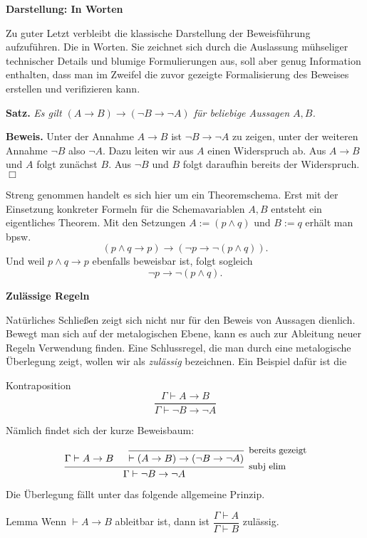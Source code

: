 \documentclass[8pt]{beamer}
\newcommand{\inote}[1]{{\small #1}}
\newcommand{\strong}[1]{\textsf{\textbf{#1}}}
\renewcommand{\qedsymbol}{\ensuremath{\Box}}
\newcommand{\centerheadline}[1]{%
  \begin{center}\strong{#1}\end{center}}
\newcommand{\parspace}{\vspace{0.8em}}
\newcommand{\cond}{\rightarrow}
\begin{document}
\begin{frame}[t]
\vspace{0.5em}
\strong{Darstellung: In Worten}

\parspace
Zu guter Letzt verbleibt die klassische Darstellung der Beweisführung
aufzuführen. Die in Worten. Sie zeichnet sich durch die Auslassung mühseliger
technischer Details und blumige Formulierungen aus, soll aber genug Information
enthalten, dass man im Zweifel die zuvor gezeigte Formalisierung des Beweises
erstellen und verifizieren kann.

\parspace
\strong{Satz.} \emph{Es gilt $(A\cond B)\cond (\lnot B\cond\lnot A)$ für
beliebige Aussagen $A,B$.}

\parspace
\strong{Beweis.}
Unter der Annahme $A\cond B$ ist $\lnot B\cond\lnot A$ zu zeigen,
unter der weiteren Annahme $\lnot B$ also $\lnot A$. Dazu leiten wir
aus $A$ einen Widerspruch ab. Aus $A\cond B$ und $A$ folgt zunächst $B$.
Aus $\lnot B$ und $B$ folgt daraufhin bereits der Widerspruch.\,\qedsymbol\pause

\parspace
Streng genommen handelt es sich hier um ein Theoremschema. Erst mit
der Einsetzung konkreter Formeln für die Schemavariablen $A,B$ entsteht
ein eigentliches Theorem. Mit den Setzungen $A:=(p\land q)$ und $B:=q$
erhält man bpsw.
\[(p\land q\cond p)\cond (\lnot p\cond\lnot (p\land q)).\]
Und weil $p\land q\cond p$ ebenfalls beweisbar ist, folgt sogleich
\[\lnot p\cond\lnot (p\land q).\]
\end{frame}

\begin{frame}
\centerheadline{Zulässige Regeln}
\end{frame}

\begin{frame}
Natürliches Schließen zeigt sich nicht nur für den Beweis von Aussagen
dienlich. Bewegt man sich auf der metalogischen Ebene, kann es auch
zur Ableitung neuer Regeln Verwendung finden. Eine Schlussregel, die
man durch eine metalogische Überlegung zeigt, wollen wir als
\emph{zulässig} bezeichnen. Ein Beispiel dafür ist die

\begin{block}{Kontraposition}
\[\dfrac{\Gamma\vdash A\cond B}{\Gamma\vdash\lnot B\cond\lnot A}\]
\end{block}

Nämlich findet sich der kurze Beweisbaum:

\[\begin{prooftree}
  \hypo{\Gamma\vdash A\cond B}
  \infer0[\inote{bereits gezeigt}]{\vdash (A\cond B)\cond (\lnot B\cond\lnot A)}
\infer2[\inote{subj elim}]{\Gamma\vdash\lnot B\cond\lnot A}
\end{prooftree}\]

Die Überlegung fällt unter das folgende allgemeine Prinzip.
\begin{block}{Lemma}
Wenn $\vdash A\cond B$ ableitbar ist, dann ist $\dfrac{\Gamma\vdash A}{\Gamma\vdash B}$ zulässig.
\end{block}
\end{frame}
\end{document}
